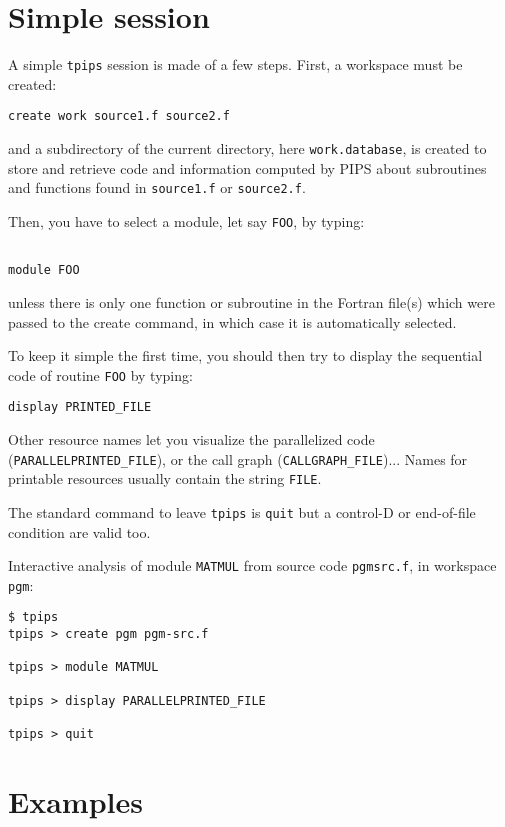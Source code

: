 \documentclass[a4paper]{article}
\begin{document}
\section{Simple session}

A simple {\tt tpips} session is made of a few steps. First, a
workspace must be created:
{\bf
\begin{verbatim}
create work source1.f source2.f
\end{verbatim}
}

and a subdirectory of the current directory, here
\texttt{work.database}, is created to store and retrieve
code and information computed by PIPS about subroutines and
functions found in \texttt{source1.f} or \texttt{source2.f}.

Then, you have to select a module, let say \texttt{FOO}, by typing:
{\bf
\begin{verbatim}

module FOO
\end{verbatim}
}

unless there is only one function or subroutine in the Fortran
file(s) which were passed to the create command, in
which case it is automatically selected.

To keep it simple the first time, you should then try to
display the sequential code of routine \texttt{FOO} by typing:

{\bf
\begin{verbatim}
display PRINTED_FILE
\end{verbatim}
}

Other resource names let you visualize the parallelized code
(\texttt{PARALLELPRINTED\_FILE}), or the call graph
(\texttt{CALLGRAPH\_FILE})...  Names for printable resources usually
contain the string \texttt{FILE}.

The standard command to leave {\tt tpips} is {\tt quit} but a control-D
or end-of-file condition are valid too.

Interactive analysis of module \texttt{MATMUL} from source code
\texttt{pgmsrc.f}, in workspace \texttt{pgm}:

{\bf
\begin{verbatim}
$ tpips
tpips > create pgm pgm-src.f

tpips > module MATMUL

tpips > display PARALLELPRINTED_FILE

tpips > quit

\end{verbatim}
}

\section{Examples}
\end{document}

